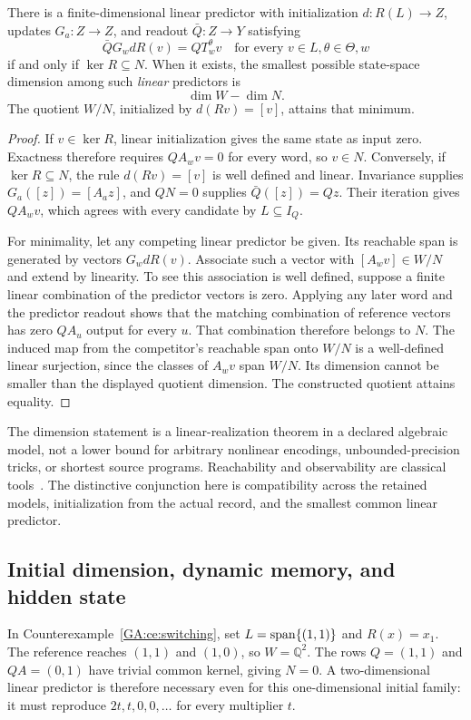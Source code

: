 \begin{GAtheorem}\label{GA:thm:linearpredictor}
There is a finite-dimensional linear predictor with initialization $d:R(L)\to Z$, updates $G_a:Z\to Z$, and readout $\bar Q:Z\to Y$ satisfying
\[
\bar QG_wdR(v)=QT_w^\theta v
\quad\text{for every }v\in L,\theta\in\Theta,w
\]
if and only if $\ker R\subseteq N$. When it exists, the smallest possible state-space dimension among such \emph{linear} predictors is
\[
\dim W-\dim N.
\]
The quotient $W/N$, initialized by $d(Rv)=[v]$, attains that minimum.
\end{GAtheorem}
\begin{proof}
If $v\in\ker R$, linear initialization gives the same state as input zero. Exactness therefore requires $QA_wv=0$ for every word, so $v\in N$. Conversely, if $\ker R\subseteq N$, the rule $d(Rv)=[v]$ is well defined and linear. Invariance supplies $G_a([z])=[A_az]$, and $QN=0$ supplies $\bar Q([z])=Qz$. Their iteration gives $QA_wv$, which agrees with every candidate by $L\subseteq I_Q$.

For minimality, let any competing linear predictor be given. Its reachable span is generated by vectors $G_wdR(v)$. Associate such a vector with $[A_wv]\in W/N$ and extend by linearity. To see this association is well defined, suppose a finite linear combination of the predictor vectors is zero. Applying any later word and the predictor readout shows that the matching combination of reference vectors has zero $QA_u$ output for every $u$. That combination therefore belongs to $N$. The induced map from the competitor's reachable span onto $W/N$ is a well-defined linear surjection, since the classes of $A_wv$ span $W/N$. Its dimension cannot be smaller than the displayed quotient dimension. The constructed quotient attains equality.
\end{proof}

The dimension statement is a linear-realization theorem in a declared algebraic model, not a lower bound for arbitrary nonlinear encodings, unbounded-precision tricks, or shortest source programs. Reachability and observability are classical tools~\cite{GA:petreczky}. The distinctive conjunction here is compatibility across the retained models, initialization from the actual record, and the smallest common linear predictor.

\subsection{Initial dimension, dynamic memory, and hidden state}
In Counterexample~\ref{GA:ce:switching}, set $L=\operatorname{span}\{(1,1)\}$ and $R(x)=x_1$. The reference reaches $(1,1)$ and $(1,0)$, so $W=\mathbb Q^2$. The rows $Q=(1,1)$ and $QA=(0,1)$ have trivial common kernel, giving $N=0$. A two-dimensional linear predictor is therefore necessary even for this one-dimensional initial family: it must reproduce $2t,t,0,0,\ldots$ for every multiplier $t$.

